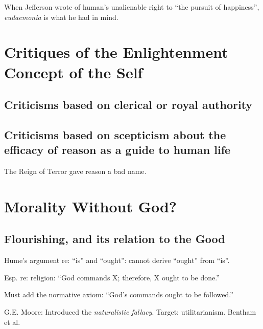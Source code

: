 \documentclass[
]{book}
\begin{document}
When Jefferson wrote of human's unalienable right to ``the pursuit of happiness'', \emph{eudaemonia} is what he had in mind.

\hypertarget{critiques-of-the-enlightenment-concept-of-the-self}{%
\chapter{Critiques of the Enlightenment Concept of the Self}\label{critiques-of-the-enlightenment-concept-of-the-self}}

\hypertarget{criticisms-based-on-clerical-or-royal-authority}{%
\section{Criticisms based on clerical or royal authority}\label{criticisms-based-on-clerical-or-royal-authority}}

\hypertarget{criticisms-based-on-scepticism-about-the-efficacy-of-reason-as-a-guide-to-human-life}{%
\section{Criticisms based on scepticism about the efficacy of reason as a guide to human life}\label{criticisms-based-on-scepticism-about-the-efficacy-of-reason-as-a-guide-to-human-life}}

The Reign of Terror gave reason a bad name.

\hypertarget{morality-without-god}{%
\chapter{Morality Without God?}\label{morality-without-god}}

\hypertarget{flourishing-and-its-relation-to-the-good}{%
\section{Flourishing, and its relation to the Good}\label{flourishing-and-its-relation-to-the-good}}

Hume's argument re: ``is'' and ``ought'': cannot derive ``ought'' from ``is''.

Esp. re: religion: ``God commands X; therefore, X ought to be done.''

Must add the normative axiom: ``God's commands ought to be followed.''

G.E. Moore: Introduced the \emph{naturalistic fallacy}.
Target: utilitarianism. Bentham et al.
\end{document}
